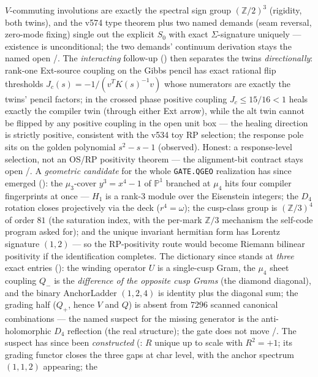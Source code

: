 \begin{keybox}
$V$-commuting involutions are exactly the spectral sign group
$(\mathbb{Z}/2)^3$ (rigidity, both twins), and the v574 type theorem
plus two named demands (seam reversal, zero-mode fixing) single out the
explicit $S_0$ with exact $\Sigma$-signature uniquely --- existence is
unconditional; the two demands' continuum derivation stays the named
open \mE/\mC.  The \emph{interacting} follow-up
() then separates the twins
\emph{directionally}: rank-one Ext-source coupling on the Gibbs pencil
has exact rational flip thresholds $J_c(s)=-1/(v^{T}K(s)^{-1}v)$ whose
numerators are exactly the twins' pencil factors; in the crossed phase
positive coupling $J_c\le 15/16<1$ heals exactly the compiler twin
(through either Ext arrow), while the alt twin cannot be flipped by any
positive coupling in the open unit box --- the healing direction is
strictly positive, consistent with the v534 toy RP selection; the
response pole sits on the golden polynomial $s^2-s-1$ (observed).
Honest: a response-level selection, not an OS/RP positivity theorem ---
the alignment-bit contract stays open \mE/\mC.  A \emph{geometric
candidate} for the whole \texttt{GATE.QGEO} realization has since
emerged (): the $\mu_3$-cover
$y^3=x^4-1$ of $\mathbb{P}^1$ branched at $\mu_4$ hits four compiler
fingerprints at once --- $H_1$ is a rank-3 module over the Eisenstein
integers; the $D_4$ rotation closes projectively via the deck
($r^4=\omega$); the cusp-class group is $(\mathbb{Z}/3)^4$ of order
$81$ (the saturation index, with the per-mark $\mathbb{Z}/3$ mechanism
the self-code program asked for); and the unique invariant hermitian
form has Lorentz signature $(1,2)$ --- so the RP-positivity route
would become Riemann bilinear positivity if the identification
completes.  The dictionary since stands at \emph{three} exact entries
(): the winding operator $U$ is a
single-cusp Gram, the $\mu_4$ sheet coupling $Q_-$ is the
\emph{difference of the opposite cusp Grams} (the diamond diagonal),
and the binary AnchorLadder $(1,2,4)$ is identity plus the diagonal
sum; the grading half ($Q_+$, hence $V$ and $Q$) is absent from $7296$
scanned canonical combinations --- the named suspect for the missing
generator is the anti-holomorphic $D_4$ reflection (the real
structure); the gate does not move \mE/\mC.  The suspect has since
been \emph{constructed} (: $R$ unique
up to scale with $R^2=+1$; its grading functor closes the three gaps
at char level, with the anchor spectrum $(1,1,2)$ appearing; the

\end{keybox}
